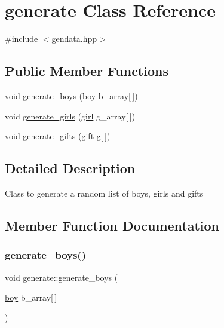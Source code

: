\hypertarget{classgenerate}{}\section{generate Class Reference}
\label{classgenerate}


{\ttfamily \#include $<$gendata.\+hpp$>$}

\subsection*{Public Member Functions}
\begin{DoxyCompactItemize}
\item 
void \hyperlink{classgenerate_ad657e5309e61b4a555fde45806262ced}{generate\+\_\+boys} (\hyperlink{classboy}{boy} b\+\_\+array\mbox{[}$\,$\mbox{]})
\item 
void \hyperlink{classgenerate_a86f4b6e0d8f4bb05f2b83726d747004c}{generate\+\_\+girls} (\hyperlink{classgirl}{girl} g\+\_\+array\mbox{[}$\,$\mbox{]})
\item 
void \hyperlink{classgenerate_a7ad6fdb15dc8952997dd9bca935201b0}{generate\+\_\+gifts} (\hyperlink{classgift}{gift} g\mbox{[}$\,$\mbox{]})
\end{DoxyCompactItemize}


\subsection{Detailed Description}
Class to generate a random list of boys, girls and gifts 

\subsection{Member Function Documentation}
\mbox{\label{classgenerate_ad657e5309e61b4a555fde45806262ced}} 
\subsubsection{\texorpdfstring{generate\+\_\+boys()}{generate\_boys()}}
{\footnotesize\ttfamily void generate\+::generate\+\_\+boys (\begin{DoxyParamCaption}\item[{\hyperlink{classboy}{boy}}]{b\+\_\+array\mbox{[}$\,$\mbox{]} }\end{DoxyParamCaption})}

